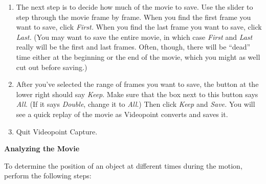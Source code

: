 \begin{enumerate}
\item The next step is to decide how much of the movie to save.
Use the slider to step through the movie frame by frame.  When you
find the first frame you want to save, click \textit{First.}  When you find
the last frame you want to save, click \textit{Last.}  
(You may want to save the 
entire movie, in which case \textit{First} and \textit{Last} really will be the
first and last frames.  Often, though, there will be ``dead'' time
either at the beginning or the end of the movie, which you might
as well cut out before saving.)

\item After you've selected the range of frames you want to save, the button
at the lower right should say \textit{Keep}.  Make sure that the 
box next to this button says \textit{All}.  (If it says \textit{Double},
change it to \textit{All}.)
Then click \textit{Keep}
and \textit{Save.}  You will see a quick replay of the movie as Videopoint
converts and saves it.

\item Quit Videopoint Capture.

\end{enumerate}
\textbf{Analyzing the Movie} 

To determine the position of an object at different times during the
motion, perform the following steps:

